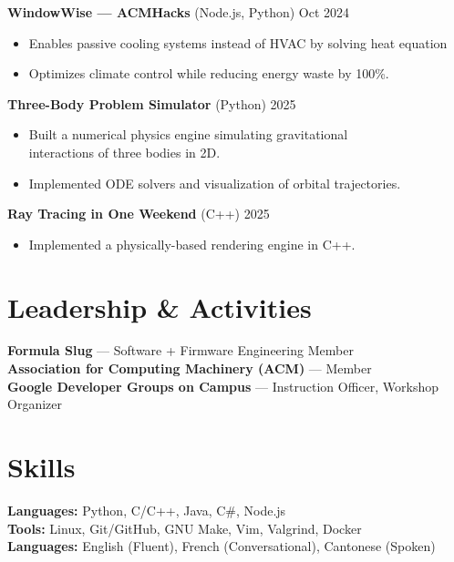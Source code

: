 \documentclass[a4paper,10pt]{article}
\begin{document}
\textbf{WindowWise --- ACMHacks} (Node.js, Python) \hfill Oct 2024
\begin{itemize}
    \item Enables passive cooling systems instead of HVAC by solving heat equation
    \item Optimizes climate control while reducing energy waste by 100\%.
\end{itemize}

\textbf{Three-Body Problem Simulator} (Python) \hfill 2025
\begin{itemize}
    \item Built a numerical physics engine simulating gravitational \\
        interactions of three bodies in 2D.
    \item Implemented ODE solvers and visualization of orbital trajectories.
\end{itemize}

\textbf{Ray Tracing in One Weekend} (C++) \hfill 2025
\begin{itemize}
    \item Implemented a physically-based rendering engine in C++.
\end{itemize}

\section*{Leadership \& Activities}
\textbf{Formula Slug} --- Software + Firmware Engineering Member \\
\textbf{Association for Computing Machinery (ACM)} --- Member \\
\textbf{Google Developer Groups on Campus} --- Instruction Officer, Workshop
Organizer

\section*{Skills}
\textbf{Languages:} Python, C/C++, Java, C\#, Node.js \\
\textbf{Tools:} Linux, Git/GitHub, GNU Make, Vim, Valgrind, Docker \\
\textbf{Languages:} English (Fluent), French (Conversational), Cantonese
(Spoken)
\end{document}
